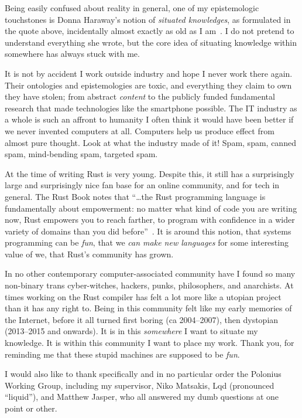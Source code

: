 \documentclass[11pt,a4paper,twoside,openany,draft]{report}
\begin{document}
{\footnotesize

  Being easily confused about reality in general, one of my epistemologic
  touchstones is Donna Haraway's notion of \textit{situated knowledges}, as
  formulated in the quote above, incidentally almost exactly as old as I
  am~\cite{haraway}. I do not pretend to understand everything she wrote, but
  the core idea of situating knowledge within somewhere has always stuck with
  me.

  It is not by accident I work outside industry and hope I never work there
  again. Their ontologies and epistemologies are toxic, and everything they
  claim to own they have stolen; from abstract \emph{content} to the publicly
  funded fundamental research that made technologies like the smartphone
  possible. The IT industry as a whole is such an affront to humanity I often
  think it would have been better if we never invented computers at all.
  Computers help us produce effect from almost pure thought. Look at what the
  industry made of it! Spam, spam, canned spam, mind-bending spam, targeted
  spam.

  At the time of writing Rust is very young. Despite this, it still has a
  surprisingly large and surprisingly nice fan base for an online community, and
  for tech in general. The Rust Book notes that ``\ldots{}the Rust programming
  language is fundamentally about empowerment: no matter what kind of code you
  are writing now, Rust empowers you to reach farther, to program with
  confidence in a wider variety of domains than you did
  before''~\cite{nichols_rust_nodate}. It is around this notion, that systems
  programming can be \emph{fun}, that we \emph{can make new languages} for some
  interesting value of we, that Rust's community has grown.

  In no other contemporary computer-associated community have I found so many
  non-binary trans cyber-witches, hackers, punks, philosophers, and anarchists.
  At times working on the Rust compiler has felt a lot more like a utopian
  project than it has any right to. Being in this community felt like my early
  memories of the Internet, before it all turned first boring (ca 2004--2007),
  then dystopian (2013--2015 and onwards). It is in this \textit{somewhere} I
  want to situate my knowledge. It is within this community I want to place my
  work. Thank you, for reminding me that these stupid machines are supposed to
  be \emph{fun}.

  I would also like to thank specifically and in no particular order the
  Polonius Working Group, including my supervisor, Niko Matsakis, Lqd
  (pronounced ``liquid''), and Matthew Jasper, who all answered my dumb
  questions at one point or other.

}
\end{document}
